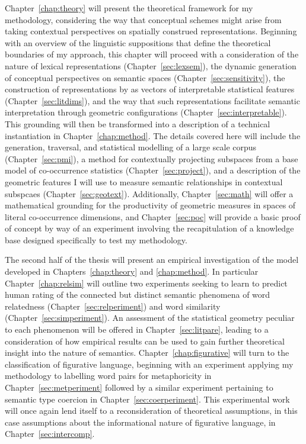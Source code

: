 Chapter~\ref{chap:theory} will present the theoretical framework for my methodology, considering the way that conceptual schemes might arise from taking contextual perspectives on spatially construed representations.  Beginning with an overview of the linguistic suppositions that define the theoretical boundaries of my approach, this chapter will proceed with a consideration of the nature of lexical representations (Chapter~\ref{sec:lexsem}), the dynamic generation of conceptual perspectives on semantic spaces (Chapter~\ref{sec:sensitivity}), the construction of representations by as vectors of interpretable statistical features (Chapter~\ref{sec:litdims}), and the way that such representations facilitate semantic interpretation through geometric configurations (Chapter~\ref{sec:interpretable}).  This grounding will then be transformed into a description of a technical instantiation in Chapter~\ref{chap:method}.  The details covered here will include the generation, traversal, and statistical modelling of a large scale corpus (Chapter~\ref{sec:pmi}), a method for contextually projecting subspaces from a base model of co-occurrence statistics (Chapter~\ref{sec:project}), and a description of the geometric features I will use to measure semantic relationships in contextual subspcaes (Chapter~\ref{sec:geotext}).  Additionally, Chapter~\ref{sec:math} will offer a mathematical grounding for the productivity of geometric measures in spaces of literal co-occurrence dimensions, and Chapter~\ref{sec:poc} will provide a basic proof of concept by way of an experiment involving the recapitulation of a knowledge base designed specifically to test my methodology.

The second half of the thesis will present an empirical investigation of the model developed in Chapters~\ref{chap:theory} and \ref{chap:method}.  In particular Chapter~\ref{chap:relsim} will outline two experiments seeking to learn to predict human rating of  the connected but distinct semantic phenomena of word relatedness (Chapter~\ref{sec:relperiment}) and word similarity (Chapter~\ref{sec:simperiment}).  An assessment of the statistical geometry peculiar to each phenomenon will be offered in Chapter~\ref{sec:litpare}, leading to a consideration of how empirical results can be used to gain further theoretical insight into the nature of semantics.  Chapter~\ref{chap:figurative} will turn to the classification of figurative language, beginning with an experiment applying my methodology to labelling word pairs for metaphoricity in Chapter~\ref{sec:metperiment} followed by a similar experiment pertaining to semantic type coercion in Chapter~\ref{sec:coerperiment}.  This experimental work will once again lend itself to a reconsideration of theoretical assumptions, in this case assumptions about the informational nature of figurative language, in Chapter~\ref{sec:intercomp}.

